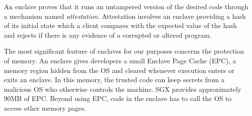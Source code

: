 \documentclass[letterpaper,twocolumn,10pt]{article}
\begin{document}
An enclave proves that it runs an untampered version of the desired code through a mechanism named \textit{attestation}. Attestation involves an enclave providing a hash of its initial state which a client compares with the expected value of the hash and rejects if there is any evidence of a corrupted or altered program.

The most significant feature of enclaves for our purposes concerns the protection of memory. An enclave gives developers a small Enclave Page Cache (EPC), a memory region hidden from the OS and cleared whenever execution enters or exits an enclave. In this memory, the trusted code can keep secrets from a malicious OS who otherwise controls the machine. SGX provides approximately 90MB of EPC. Beyond using EPC, code in the enclave has to call the OS to access other memory pages.
\end{document}
